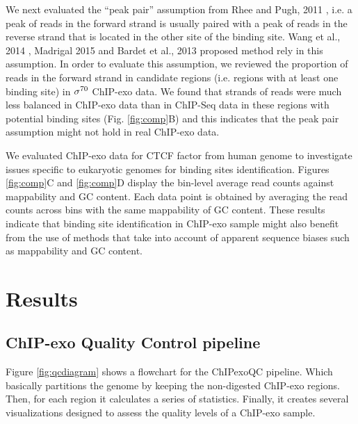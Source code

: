 \documentclass[11pt]{article}\usepackage[]{graphicx}\usepackage[]{color}
\begin{document}
We next evaluated the ``peak pair'' assumption from Rhee and Pugh,
2011 \cite{exo1}, i.e. a peak of reads in the forward strand is
usually paired with a peak of reads in the reverse strand that is
located in the other site of the binding site. Wang et al., 2014
\cite{mace}, Madrigal 2015 \cite{cexor} and Bardet et al., 2013
\cite{peakzilla} proposed method rely in this assumption. In order to
evaluate this assumption, we reviewed the proportion of reads in the
forward strand in candidate regions (i.e. regions with at least one
binding site) in $\sigma^{70}$ ChIP-exo data. We found that strands of reads
were much less balanced in ChIP-exo data than in ChIP-Seq data in
these regions with potential binding sites (Fig. \ref{fig:comp}B) and
this indicates that the peak pair assumption might not hold in real
ChIP-exo data.

We evaluated ChIP-exo data for CTCF factor from human genome
\cite{exo1} to investigate issues specific to eukaryotic genomes for
binding sites identification. Figures \ref{fig:comp}C and
\ref{fig:comp}D display the bin-level average read counts against
mappability and GC content. Each data point is obtained by averaging
the read counts across bins with the same mappability of GC
content. These results indicate that binding site identification in
ChIP-exo sample might also benefit from the use of methods that take
into account of apparent sequence biases such as mappability and GC
content.

\section{Results}
\label{sec:results}


\subsection{ChIP-exo Quality Control pipeline}
\label{sec:QC}

Figure \ref{fig:qcdiagram} shows a flowchart for the ChIPexoQC
pipeline. Which basically partitions the genome by keeping the
non-digested ChIP-exo regions. Then, for each region it calculates a
series of statistics. Finally, it creates several visualizations
designed to assess the quality levels of a ChIP-exo sample.
\end{document}
